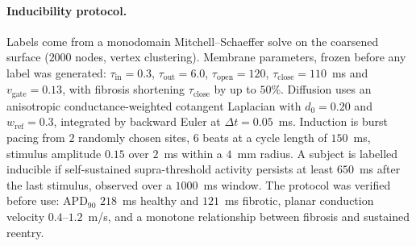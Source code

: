 \documentclass[11pt]{article}
\theoremstyle{definition}
\begin{document}
\paragraph{Inducibility protocol.} Labels come from a monodomain
Mitchell--Schaeffer solve on the coarsened surface ($2000$ nodes, vertex
clustering). Membrane parameters, frozen before any label was generated:
$\tau_{\mathrm{in}}=0.3$, $\tau_{\mathrm{out}}=6.0$, $\tau_{\mathrm{open}}=120$,
$\tau_{\mathrm{close}}=110$~ms and $v_{\mathrm{gate}}=0.13$, with fibrosis
shortening $\tau_{\mathrm{close}}$ by up to $50\%$. Diffusion uses an anisotropic
conductance-weighted cotangent Laplacian with $d_0=0.20$ and $w_{\mathrm{ref}}=0.3$,
integrated by backward Euler at $\Delta t=0.05$~ms. Induction is burst pacing from
$2$ randomly chosen sites, $6$ beats at a cycle length of $150$~ms, stimulus
amplitude $0.15$ over $2$~ms within a $4$~mm radius. A subject is labelled
inducible if self-sustained supra-threshold activity persists at least $650$~ms
after the last stimulus, observed over a $1000$~ms window. The protocol was
verified before use: APD$_{90}$ $218$~ms healthy and $121$~ms fibrotic, planar
conduction velocity $0.4$--$1.2$~m/s, and a monotone relationship between fibrosis
and sustained reentry.
\end{document}
